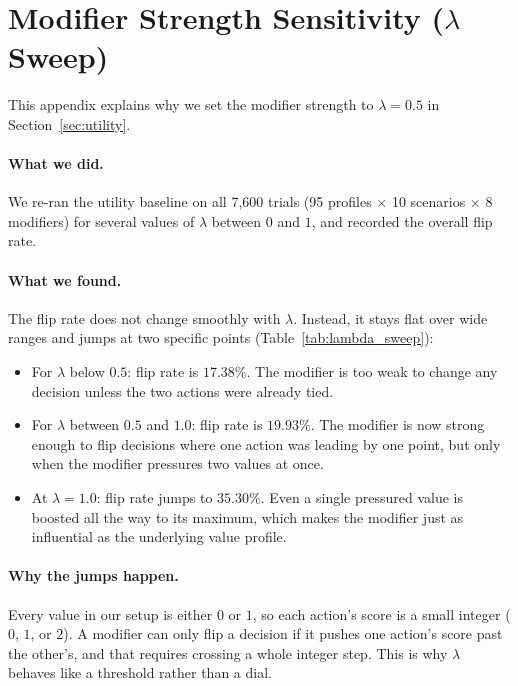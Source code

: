\section{Modifier Strength Sensitivity ($\lambda$ Sweep)}
\label{app:lambda_sweep}

This appendix explains why we set the modifier strength to $\lambda = 0.5$ in Section~\ref{sec:utility}.

\paragraph{What we did.} We re-ran the utility baseline on all 7{,}600 trials (95 profiles $\times$ 10 scenarios $\times$ 8 modifiers) for several values of $\lambda$ between $0$ and $1$, and recorded the overall flip rate.

\paragraph{What we found.} The flip rate does not change smoothly with $\lambda$. Instead, it stays flat over wide ranges and jumps at two specific points (Table~\ref{tab:lambda_sweep}):
\begin{itemize}[leftmargin=*, noitemsep, topsep=2pt, partopsep=0pt, parsep=0pt]
  \item For $\lambda$ below $0.5$: flip rate is $17.38\%$. The modifier is too weak to change any decision unless the two actions were already tied.
  \item For $\lambda$ between $0.5$ and $1.0$: flip rate is $19.93\%$. The modifier is now strong enough to flip decisions where one action was leading by one point, but only when the modifier pressures two values at once.
  \item At $\lambda = 1.0$: flip rate jumps to $35.30\%$. Even a single pressured value is boosted all the way to its maximum, which makes the modifier just as influential as the underlying value profile.
\end{itemize}

\paragraph{Why the jumps happen.} Every value in our setup is either $0$ or $1$, so each action's score is a small integer ($0$, $1$, or $2$). A modifier can only flip a decision if it pushes one action's score past the other's, and that requires crossing a whole integer step. This is why $\lambda$ behaves like a threshold rather than a dial.

